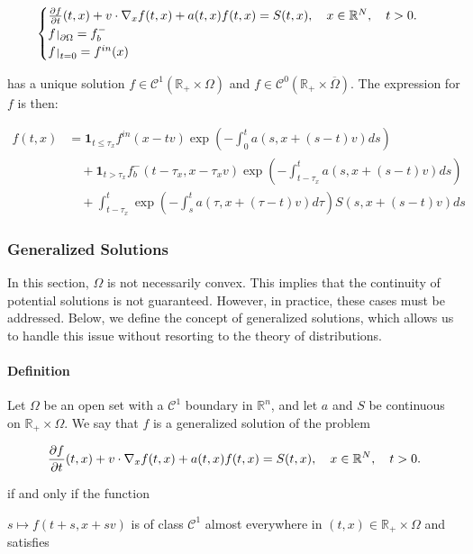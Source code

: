 \documentclass[a4paper, 11pt]{article}
\def\restriction#1#2{\mathchoice
	{\setbox1\hbox{${\displaystyle #1}_{\scriptstyle #2}$}
		\restrictionaux{#1}{#2}}
	{\setbox1\hbox{${\textstyle #1}_{\scriptstyle #2}$}
		\restrictionaux{#1}{#2}}
	{\setbox1\hbox{${\scriptstyle #1}_{\scriptscriptstyle #2}$}
		\restrictionaux{#1}{#2}}
	{\setbox1\hbox{${\scriptscriptstyle #1}_{\scriptscriptstyle #2}$}
		\restrictionaux{#1}{#2}}}
\def\restrictionaux#1#2{{#1\,\smash{\vrule height .8\ht1 depth .85\dp1}}_{\,#2}}
\begin{document}
\[
\begin{cases}
	\frac{\partial f}{\partial t}(t,x)+v \cdot \nabla_x f(t,x)+ a(t,x)f(t,x)=S(t,x), \quad x \in \mathbb{R}^N, \quad t>0.\\
	\restriction{f}{\partial \Omega}= f_b^-\\
	\restriction{f}{t=0}= f^{in}(x)
\end{cases}
\]

has a unique solution $f \in \mathcal{C}^1(\mathbb{R}_+ \times \Omega)$ and $f \in \mathcal{C}^0(\mathbb{R}_+ \times \overline{\Omega})$. The expression for $f$ is then:


\[
\boxed{
	\begin{aligned}
		f(t,x) &= \mathbf{1}_{t \leq \tau_x} f^{in} (x-tv) \exp\left(-\int_0^t a(s,x+(s-t)v)ds\right) \\
		&\quad + \mathbf{1}_{t > \tau_x} f_b^- (t-\tau_x,x-\tau_x v) \exp\left(-\int_{t-\tau_x}^t a(s,x+(s-t)v)ds\right) \\
		&\quad + \int_{t-\tau_x}^t \exp\left(-\int_{s}^{t}a(\tau,x+(\tau-t)v)d\tau\right) S(s,x+(s-t)v)ds
\end{aligned}}
\]


\subsubsection{Generalized Solutions}

In this section, $\Omega$ is not necessarily convex. This implies that the continuity of potential solutions is not guaranteed. However, in practice, these cases must be addressed. Below, we define the concept of generalized solutions, which allows us to handle this issue without resorting to the theory of distributions.


\paragraph{Definition}

Let $\Omega$ be an open set with a $\mathcal{C}^1$ boundary in $\mathbb{R}^n$, and let $a$ and $S$ be continuous on $\mathbb{R}_+ \times \Omega$. We say that $f$ is a generalized solution of the problem

$$\frac{\partial f}{\partial t}(t,x)+v \cdot \nabla_x f(t,x)+ a(t,x)f(t,x)=S(t,x), \quad x \in \mathbb{R}^N, \quad t>0.\\$$

if and only if the function

$s \mapsto f(t+s,x+sv)$ is of class $\mathcal{C}^1$ almost everywhere in $(t,x) \in \mathbb{R}_+ \times \Omega$ and satisfies
\end{document}
